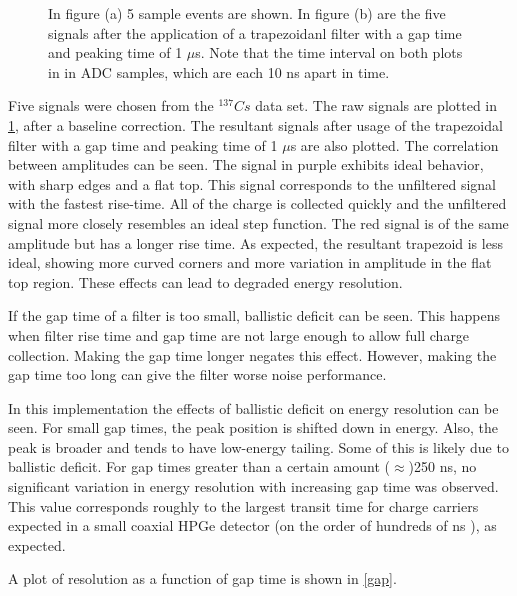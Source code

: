 \begin{figure}%
    \centering
    \quad
    \caption{In figure (a) 5 sample events are shown. In figure (b) are the five signals after the application of a trapezoidanl filter with a gap time and peaking time of 1 $\mu$s. Note that the time interval on both plots in in ADC samples, which are each 10 ns apart in time.}%
    \label{fig:signals}%
\end{figure}

Five signals were chosen from the ${}^{137}{Cs}$ data set. The raw signals are plotted in \ref{fig:signals}, after a baseline correction. The resultant signals after usage of the trapezoidal filter with a gap time and peaking time of 1 $\mu$s are also plotted. The correlation between amplitudes can be seen. The signal in purple exhibits ideal behavior, with sharp edges and a flat top. This signal corresponds to the unfiltered signal with the fastest rise-time. All of the charge is collected quickly and the unfiltered signal more closely resembles an ideal step function. The red signal is of the same amplitude but has a longer rise time. As expected, the resultant trapezoid is less ideal, showing more curved corners and more variation in amplitude in the flat top region. These effects can lead to degraded energy resolution.

If the gap time of a filter is too small, ballistic deficit can be seen. This happens when filter rise time and gap time are not large enough to allow full charge collection. Making the gap time longer negates this effect. However, making the gap time too long can give the filter worse noise performance. 

In this implementation the effects of ballistic deficit on energy resolution can be seen. For small gap times, the peak position is shifted down in energy. Also, the peak is broader and tends to have low-energy tailing. Some of this is likely due to ballistic deficit. For gap times greater than a certain amount ($\approx$)250 ns, no significant variation in energy resolution with increasing gap time was observed. This value corresponds roughly to the largest transit time for charge carriers expected in a small coaxial HPGe detector (on the order of hundreds of ns \cite{Knoll} ), as expected.

A plot of resolution as a function of gap time is shown in \ref{gap}.

